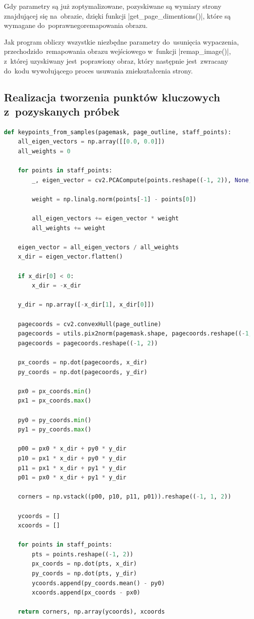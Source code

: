 Gdy parametry są już zoptymalizowane, pozyskiwane są wymiary strony znajdującej się \linebreak na~obrazie, dzięki funkcji \pyth|get_page_dimentions()|, które są wymagane do~poprawnego\linebreak remapowania obrazu.

Jak program obliczy wszystkie niezbędne parametry do~usunięcia wypaczenia, przechodzi\linebreak do~remapowania obrazu wejściowego w~funkcji \pyth|remap_image()|, z~której uzyskiwany jest~poprawiony obraz, który następnie jest~zwracany do~kodu wywołującego proces usuwania zniekształcenia strony.

\subsection{Realizacja tworzenia punktów kluczowych z~pozyskanych próbek}

\begin{lstlisting}[caption={\pyth|keypoints_from_samples()| - funkcja tworząca tablice punktów kluczowych z~pozyskanych próbek.}, label={keypoints-from-samples}, language=Python]
def keypoints_from_samples(pagemask, page_outline, staff_points):
	all_eigen_vectors = np.array([[0.0, 0.0]])
	all_weights = 0
	
	for points in staff_points:
		_, eigen_vector = cv2.PCACompute(points.reshape((-1, 2)), None, maxComponents=1)
		
		weight = np.linalg.norm(points[-1] - points[0])
		
		all_eigen_vectors += eigen_vector * weight
		all_weights += weight
	
	eigen_vector = all_eigen_vectors / all_weights
	x_dir = eigen_vector.flatten()
	
	if x_dir[0] < 0:
		x_dir = -x_dir
	
	y_dir = np.array([-x_dir[1], x_dir[0]])
	
	pagecoords = cv2.convexHull(page_outline)
	pagecoords = utils.pix2norm(pagemask.shape, pagecoords.reshape((-1, 1, 2)))
	pagecoords = pagecoords.reshape((-1, 2))
	
	px_coords = np.dot(pagecoords, x_dir)
	py_coords = np.dot(pagecoords, y_dir)
	
	px0 = px_coords.min()
	px1 = px_coords.max()
	
	py0 = py_coords.min()
	py1 = py_coords.max()
	
	p00 = px0 * x_dir + py0 * y_dir
	p10 = px1 * x_dir + py0 * y_dir
	p11 = px1 * x_dir + py1 * y_dir
	p01 = px0 * x_dir + py1 * y_dir
	
	corners = np.vstack((p00, p10, p11, p01)).reshape((-1, 1, 2))
	
	ycoords = []
	xcoords = []
	
	for points in staff_points:
		pts = points.reshape((-1, 2))
		px_coords = np.dot(pts, x_dir)
		py_coords = np.dot(pts, y_dir)
		ycoords.append(py_coords.mean() - py0)
		xcoords.append(px_coords - px0)
	
	return corners, np.array(ycoords), xcoords
\end{lstlisting}

